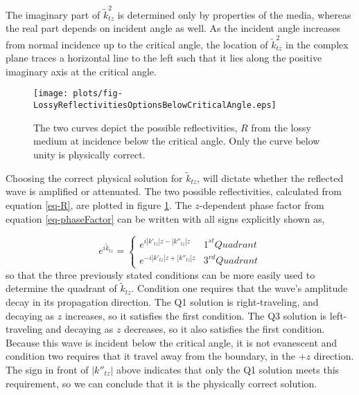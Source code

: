 \documentclass[12pt]{uthesis-v12}
\begin{document}
The imaginary part of $\tilde{k}^2_{tz}$ is determined only by properties of the media, whereas the real part depends on incident angle as well. As the incident angle increases from normal incidence up to the critical angle, the location of $\tilde{k}^2_{tz}$ in the complex plane traces a horizontal line to the left such that it lies along the positive imaginary axis at the critical angle.

\begin{figure}[ht]
\centering
  \texttt{[image: plots/fig-LossyReflectivitiesOptionsBelowCriticalAngle.eps]}
\caption[Two possible Reflectivities from lossy medium below critical angle]{The two curves depict the possible reflectivities, $R$ from the lossy medium at incidence below the critical angle. Only the curve below unity is physically correct. 
 \label{fig-LossyReflectivitiesOptionsBelowCriticalAngle}}
\end{figure}

Choosing the correct physical solution for $\tilde{k}_{tz}$, will dictate whether the reflected wave is amplified or attenuated. The two possible reflectivities, calculated from equation \ref{eq-R}, are plotted in figure \ref{fig-LossyReflectivitiesOptionsBelowCriticalAngle}. The $z$-dependent phase factor from equation \ref{eq-phaseFactor} can be written with all signs explicitly shown as,

\begin{equation}
e^{i\tilde{k}_{tz}} = \begin{cases}
    e^{i|k'_{tz}|z-|k''_{tz}|z}       & 1^{st} Quadrant \\
    e^{-i|k'_{tz}|z+|k''_{tz}|z}      & 3^{rd} Quadrant
\end{cases}
\end{equation}
so that the three previously stated conditions can be more easily used to determine the quadrant of $\tilde{k}_{tz}$. Condition one requires that the wave's amplitude decay in its propagation direction. The Q1 solution is right-traveling, and decaying as $z$ increases, so it satisfies the first condition. The Q3 solution is left-traveling and decaying as $z$ decreases, so it also satisfies the first condition.  Because this wave is incident below the critical angle, it is not evanescent and  condition two requires that it travel away from the boundary, in the $+z$ direction. The sign in front of $|k''_{tz}|$ above indicates that only the Q1 solution meets this requirement, so we can conclude that it is the physically correct solution.
\end{document}
